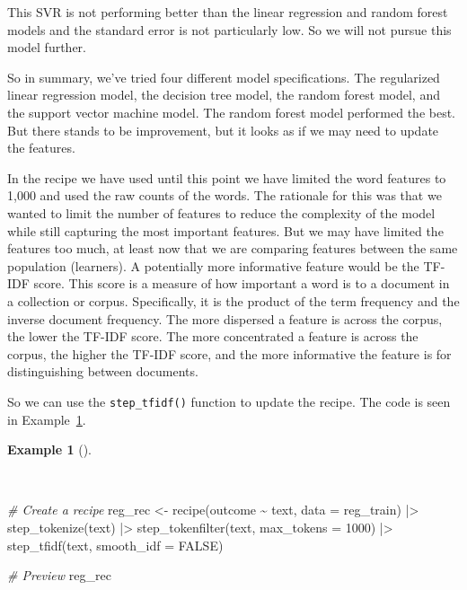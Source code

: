 \documentclass[
  letterpaper,
  DIV=11,
  numbers=noendperiod]{scrreprt}
\newenvironment{Shaded}{\begin{snugshade}}{\end{snugshade}}
\newcommand{\AttributeTok}[1]{\textcolor[rgb]{0.00,0.00,0.00}{#1}}
\newcommand{\CommentTok}[1]{\textcolor[rgb]{0.00,0.00,0.00}{\textit{#1}}}
\newcommand{\ConstantTok}[1]{\textcolor[rgb]{0.00,0.00,0.00}{#1}}
\newcommand{\DecValTok}[1]{\textcolor[rgb]{0.00,0.00,0.00}{#1}}
\newcommand{\FunctionTok}[1]{\textcolor[rgb]{0.00,0.00,0.00}{#1}}
\newcommand{\NormalTok}[1]{\textcolor[rgb]{0.00,0.00,0.00}{#1}}
\newcommand{\OtherTok}[1]{\textcolor[rgb]{0.00,0.00,0.00}{#1}}
\newcommand{\SpecialCharTok}[1]{\textcolor[rgb]{0.00,0.00,0.00}{#1}}
\theoremstyle{definition}
\newtheorem{example}{Example}[chapter]
\theoremstyle{remark}
\begin{document}
This SVR is not performing better than the linear regression and random
forest models and the standard error is not particularly low. So we will
not pursue this model further.

So in summary, we've tried four different model specifications. The
regularized linear regression model, the decision tree model, the random
forest model, and the support vector machine model. The random forest
model performed the best. But there stands to be improvement, but it
looks as if we may need to update the features.

In the recipe we have used until this point we have limited the word
features to 1,000 and used the raw counts of the words. The rationale
for this was that we wanted to limit the number of features to reduce
the complexity of the model while still capturing the most important
features. But we may have limited the features too much, at least now
that we are comparing features between the same population (learners). A
potentially more informative feature would be the TF-IDF score. This
score is a measure of how important a word is to a document in a
collection or corpus. Specifically, it is the product of the term
frequency and the inverse document frequency. The more dispersed a
feature is across the corpus, the lower the TF-IDF score. The more
concentrated a feature is across the corpus, the higher the TF-IDF
score, and the more informative the feature is for distinguishing
between documents.

So we can use the \texttt{step\_tfidf()} function to update the recipe.
The code is seen in Example~\ref{exm-pda-reg-recipe-tfidf}.

\begin{example}[]\protect\hypertarget{exm-pda-reg-recipe-tfidf}{}\label{exm-pda-reg-recipe-tfidf}

~

\begin{Shaded}
\begin{Highlighting}[]
\CommentTok{\# Create a recipe}
\NormalTok{reg\_rec }\OtherTok{\textless{}{-}}
  \FunctionTok{recipe}\NormalTok{(outcome }\SpecialCharTok{\textasciitilde{}}\NormalTok{ text, }\AttributeTok{data =}\NormalTok{ reg\_train) }\SpecialCharTok{|\textgreater{}}
  \FunctionTok{step\_tokenize}\NormalTok{(text) }\SpecialCharTok{|\textgreater{}}
  \FunctionTok{step\_tokenfilter}\NormalTok{(text, }\AttributeTok{max\_tokens =} \DecValTok{1000}\NormalTok{) }\SpecialCharTok{|\textgreater{}}
  \FunctionTok{step\_tfidf}\NormalTok{(text, }\AttributeTok{smooth\_idf =} \ConstantTok{FALSE}\NormalTok{)}

\CommentTok{\# Preview}
\NormalTok{reg\_rec}
\end{Highlighting}
\end{Shaded}

\end{example}
\end{document}
